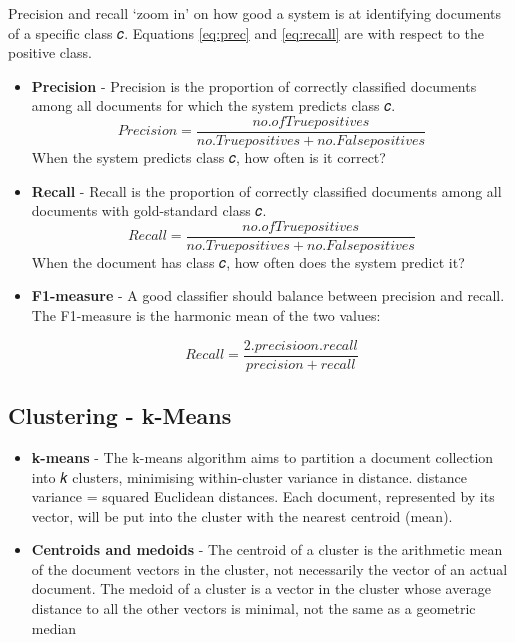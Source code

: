 \documentclass[a4paper, 12pt]{article}
\begin{document}
Precision and recall ‘zoom in’ on how good a system is at
identifying documents of a specific class 𝑐.
Equations \ref{eq:prec} and \ref{eq:recall} are with respect to the positive class.

\begin{itemize}
    \item {\textbf{Precision} - Precision is the proportion of correctly classified documents
among all documents for which the system predicts class 𝑐.
				\begin{equation}
						Precision = \frac{no. of True positives}{no. True positives+no. False positives}
				\label{eq:prec}
				\end{equation}
						When the system predicts class 𝑐, how often is it correct?}
    \item {\textbf{Recall} - Recall is the proportion of correctly classified documents among
all documents with gold-standard class 𝑐.
				\begin{equation}
						Recall = \frac{no. of True positives}{no. True positives+no. False positives}
				\label{eq:recall}
				\end{equation}
When the document has class 𝑐, how often does the system predict it?}
    \item {\textbf{F1-measure} - A good classifier should balance between precision and recall. The F1-measure is the harmonic mean of the two values:
		
						\begin{equation}
						Recall = \frac{2. precisioon . recall}{precision + recall}
				\label{eq:f1}
				\end{equation}
			}
\end{itemize}
\cite{TextMininglecture}

\subsection{Clustering - k-Means}

\begin{itemize}
    \item {\textbf{k-means} - The k-means algorithm aims to partition a document collection
into 𝑘 clusters, minimising within-cluster variance in distance.
distance variance = squared Euclidean distances. Each document, represented by its vector, will be put into the
cluster with the nearest centroid (mean).}
    \item {\textbf{Centroids and medoids} - The centroid of a cluster is the arithmetic mean of the document
vectors in the cluster, not necessarily the vector of an actual document. The medoid of a cluster is a vector in the cluster whose average
distance to all the other vectors is minimal, not the same as a geometric median }
\end{itemize}
\end{document}
